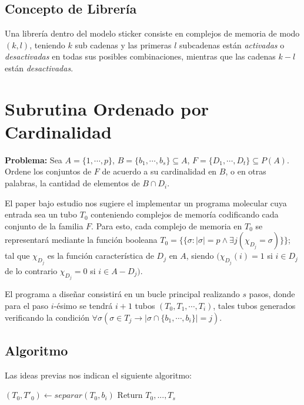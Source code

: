 \documentclass[12pt, letterpaper, twoside]{article}
\begin{document}
    \subsection{Concepto de Librería}
    Una librería dentro del modelo sticker consiste en complejos de memoria de modo $(k,l)$, teniendo $k$ sub cadenas y las primeras $l$ subcadenas están \emph{activadas} o \emph{desactivadas} en todas sus posibles combinaciones, mientras que las cadenas $k -l$ están \emph{desactivadas}.

    \section{Subrutina Ordenado por Cardinalidad}


    \textbf{Problema:} Sea $A = \{1,\cdots,p\}$, $B = \{b_1,\cdots,b_s\} \subseteq A$, $F = \{D_1,\cdots,D_t\} \subseteq P(A)$. Ordene los conjuntos de $F$ de acuerdo a su cardinalidad en $B$, o en otras palabras, la cantidad de elementos de $B\cap D_i$.


    El paper bajo estudio nos sugiere el implementar un programa molecular cuya entrada sea un tubo $T_0$ conteniendo complejos de memoría codificando cada conjunto de la familia $F$. Para esto, cada complejo de memoria en $T_0$ se representará mediante la función booleana  $T_0=\{\{\sigma:|\sigma|=p \land \exists j(\chi_{D_j}=\sigma)\}\}$; tal que $\chi_{D_j}$ es la función característica de $D_j$ en $A$, siendo $(\chi_{D_j}(i) = 1$ si $i \in D_j$ de lo contrario $\chi_{D_j} = 0$ si $i \in A - D_j)$.


    El programa a diseñar consistirá en un bucle principal realizando $s$ pasos, donde para el paso $i$-ésimo se tendrá $i+1$ tubos $(T_0, T_1,\cdots,T_i)$, tales tubos generados verificando la condición $\forall\sigma(\sigma\in T_j \rightarrow|\sigma\cap\{b_1,\cdots,b_i\}|=j)$.
    \subsection{Algoritmo}
    Las ideas previas nos indican el siguiente algoritmo: 
    \begin{algorithm}
        \begin{algorithmic}[1]
            \State $(T_0, T'_0) \leftarrow separar(T_0, b_i)$
            \EndFor
            \EndFor
            \State Return $T_0,...,T_s$
            \EndProcedure
        \end{algorithmic}
    \end{algorithm}
\end{document}
